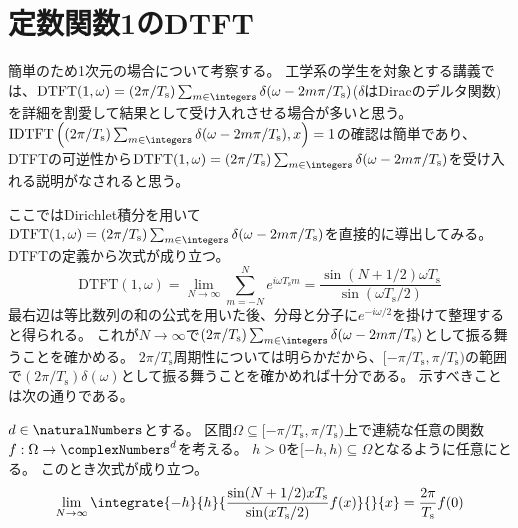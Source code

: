 			\section{定数関数1のDTFT}
				\label{定数関数1のDTFT}
				簡単のため1次元の場合について考察する。
				工学系の学生を対象とする講義では、$\text{DTFT}(1,\omega) = (2\pi/T_\text{s})\sum_{m\in\integers}\delta(\omega-2m\pi/T_\text{s})$($\delta$はDiracのデルタ関数)を詳細を割愛して結果として受け入れさせる場合が多いと思う。
				$\text{IDTFT}\left((2\pi/T_\text{s})\sum_{m\in\integers}\delta(\omega-2m\pi/T_\text{s}),x\right)=1$の確認は簡単であり、DTFTの可逆性から$\text{DTFT}(1,\omega) = (2\pi/T_\text{s})\sum_{m\in\integers}\delta(\omega-2m\pi/T_\text{s})$を受け入れる説明がなされると思う。
				\par
				ここではDirichlet積分を用いて$\text{DTFT}(1,\omega) = (2\pi/T_\text{s})\sum_{m\in\integers}\delta(\omega-2m\pi/T_\text{s})$を直接的に導出してみる。
				DTFTの定義から次式が成り立つ。
				\[
					\text{DTFT}(1,\omega) = \lim_{N\to\infty} \sum_{m=-N}^N e^{i\omega T_\text{s} m} = \frac{\sin(N+1/2)\omega T_\text{s}}{\sin(\omega T_\text{s}/2)}
				\]
				最右辺は等比数列の和の公式を用いた後、分母と分子に$e^{-i\omega/2}$を掛けて整理すると得られる。
				これが$N\to\infty$で$(2\pi/T_\text{s})\sum_{m\in\integers}\delta(\omega-2m\pi/T_\text{s})$として振る舞うことを確かめる。
				$2\pi/T_\text{s}$周期性については明らかだから、$[-\pi/T_\text{s},\pi/T_\text{s})$の範囲で$(2\pi/T_\text{s})\delta(\omega)$として振る舞うことを確かめれば十分である。
				示すべきことは次の通りである。
				\begin{shadebox}
					$d\in\naturalNumbers$とする。
					区間$\Omega \subseteq [-\pi/T_\text{s},\pi/T_\text{s})$上で連続な任意の関数$f:\Omega\to\complexNumbers^d$を考える。
					$h>0$を$[-h,h) \subseteq \Omega$となるように任意にとる。
					このとき次式が成り立つ。
					\[
						\lim_{N\to\infty} \integrate{-h}{h}{\frac{\sin(N+1/2)x T_\text{s}}{\sin(x T_\text{s}/2)} f(x)}{}{x} = \frac{2\pi}{T_\text{s}} f(0)
					\]
				\end{shadebox}
